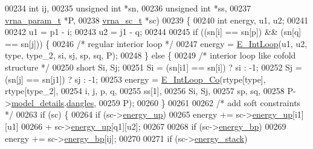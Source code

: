 \begin{DoxyCode}
00234                    \textcolor{keywordtype}{int}            ij,
00235                    \textcolor{keywordtype}{unsigned} \textcolor{keywordtype}{int}   *sn,
00236                    \textcolor{keywordtype}{unsigned} \textcolor{keywordtype}{int}   *ss,
00237                    \mbox{\hyperlink{group__energy__parameters_structvrna__param__s}{vrna\_param\_t}}   *P,
00238                    \mbox{\hyperlink{group__soft__constraints_structvrna__sc__s}{vrna\_sc\_t}}      *sc)
00239 \{
00240   \textcolor{keywordtype}{int} energy, u1, u2;
00241 
00242   u1  = p1 - i;
00243   u2  = j1 - q;
00244 
00245   \textcolor{keywordflow}{if} ((sn[i] == sn[p]) && (sn[q] == sn[j])) \{
00246     \textcolor{comment}{/* regular interior loop */}
00247     energy = \mbox{\hyperlink{group__loops_gaafbc187b7f78e8e82afb77dd6f3b8fc5}{E\_IntLoop}}(u1, u2, type, type\_2, si, sj, sp, sq, P);
00248   \} \textcolor{keywordflow}{else} \{
00249     \textcolor{comment}{/* interior loop like cofold structure */}
00250     \textcolor{keywordtype}{short} Si, Sj;
00251     Si      = (sn[i1] == sn[i]) ? si : -1;
00252     Sj      = (sn[j] == sn[j1]) ? sj : -1;
00253     energy  = \mbox{\hyperlink{group__loops_ga2d2e4f3f3448c9060763dac6c0c489f0}{E\_IntLoop\_Co}}(rtype[type], rtype[type\_2],
00254                            i, j, p, q,
00255                            ss[1],
00256                            Si, Sj,
00257                            sp, sq,
00258                            P->\mbox{\hyperlink{group__energy__parameters_a7b84353eb9075c595bad4ceb871bcae7}{model\_details}}.\mbox{\hyperlink{group__model__details_adcda4ff2ea77748ae0e8700288282efc}{dangles}},
00259                            P);
00260   \}
00261 
00262   \textcolor{comment}{/* add soft constraints */}
00263   \textcolor{keywordflow}{if} (sc) \{
00264     \textcolor{keywordflow}{if} (sc->\mbox{\hyperlink{group__soft__constraints_a57e4dbb924ab11f304e3762a3a9b07a1}{energy\_up}})
00265       energy += sc->\mbox{\hyperlink{group__soft__constraints_a57e4dbb924ab11f304e3762a3a9b07a1}{energy\_up}}[i1][u1]
00266                 + sc->\mbox{\hyperlink{group__soft__constraints_a57e4dbb924ab11f304e3762a3a9b07a1}{energy\_up}}[q1][u2];
00267 
00268     \textcolor{keywordflow}{if} (sc->\mbox{\hyperlink{group__soft__constraints_ad139b8e06632e00cbcf3909815d0d03d}{energy\_bp}})
00269       energy += sc->\mbox{\hyperlink{group__soft__constraints_ad139b8e06632e00cbcf3909815d0d03d}{energy\_bp}}[ij];
00270 
00271     \textcolor{keywordflow}{if} (sc->\mbox{\hyperlink{group__soft__constraints_ac20dded6068e81acd0f1139092f66a22}{energy\_stack}})

\end{DoxyCode}

